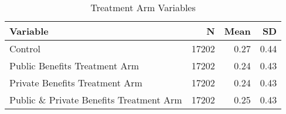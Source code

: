 \begin{table}[!t]
\caption*{
{\large Treatment Arm Variables}
} 
\fontsize{12.0pt}{14.4pt}\selectfont
\begin{tabular*}{\linewidth}{@{\extracolsep{\fill}}lrrr}
\toprule
Variable & N & Mean & SD \\ 
\midrule\addlinespace[2.5pt]
Control & 17202 & 0.27 & 0.44 \\ 
Public Benefits Treatment Arm & 17202 & 0.24 & 0.43 \\ 
Private Benefits Treatment Arm & 17202 & 0.24 & 0.43 \\ 
Public \& Private Benefits Treatment Arm & 17202 & 0.25 & 0.43 \\ 
\bottomrule
\end{tabular*}
\end{table}

